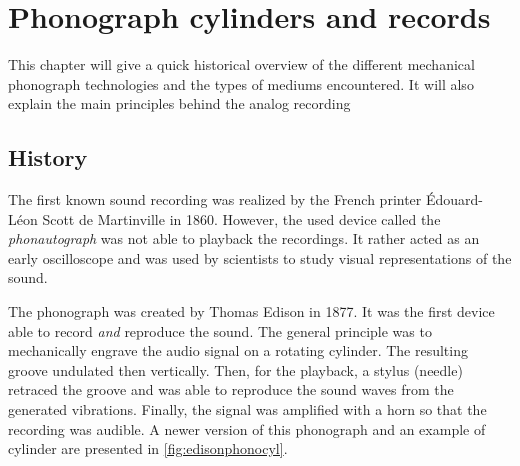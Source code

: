 

\chapter{Phonograph cylinders and records}

This chapter will give a quick historical overview of the different mechanical phonograph technologies and the types of mediums encountered. It will also explain the main principles behind the analog recording

\section{History}

The first known sound recording was realized by the French printer Édouard-Léon Scott de Martinville in 1860. However, the used device called the \emph{phonautograph} was not able to playback the recordings. It rather acted as an early oscilloscope and was used by scientists to study visual representations of the sound.

The phonograph was created by Thomas Edison in 1877. It was the first device able to record \emph{and} reproduce the sound. The general principle was to mechanically engrave the audio signal on a rotating cylinder. The resulting groove undulated then vertically. Then, for the playback, a stylus (needle) retraced the groove and was able to reproduce the sound waves from the generated vibrations. Finally, the signal was amplified with a horn so that the recording was audible. A newer version of this phonograph and an example of cylinder are presented in \autoref{fig:edisonphonocyl}.

